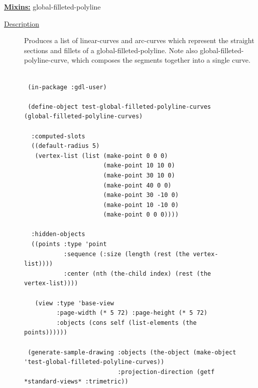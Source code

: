 \documentclass [11pt]{book}
\begin{document}
\begin{itemize}
\textbf{
\underline{Mixins:}} global-filleted-polyline





\begin{description}

\item [
\underline{Description}]


Produces a list of linear-curves and arc-curves which represent the straight sections
and fillets of a global-filleted-polyline. Note also global-filleted-polyline-curve, which composes the segments together 
into a single curve.



\end{description}




\begin{figure}
\begin{lrbox}{\boxedverb}
\begin{minipage}{\linewidth}
{\small

\begin{verbatim}

 (in-package :gdl-user)

 (define-object test-global-filleted-polyline-curves (global-filleted-polyline-curves)
                    
  :computed-slots
  ((default-radius 5)
   (vertex-list (list (make-point 0 0 0)
                      (make-point 10 10 0)
                      (make-point 30 10 0)
                      (make-point 40 0 0)
                      (make-point 30 -10 0)
                      (make-point 10 -10 0)
                      (make-point 0 0 0))))

  :hidden-objects
  ((points :type 'point
           :sequence (:size (length (rest (the vertex-list))))
           :center (nth (the-child index) (rest (the vertex-list))))

   (view :type 'base-view
         :page-width (* 5 72) :page-height (* 5 72)
         :objects (cons self (list-elements (the points))))))

 (generate-sample-drawing :objects (the-object (make-object 'test-global-filleted-polyline-curves))
                          :projection-direction (getf *standard-views* :trimetric))


\end{verbatim}}
\end{minipage}
\end{lrbox}
\fbox{\usebox{\boxedverb}}


\end{figure}
\end{itemize}
\end{document}
